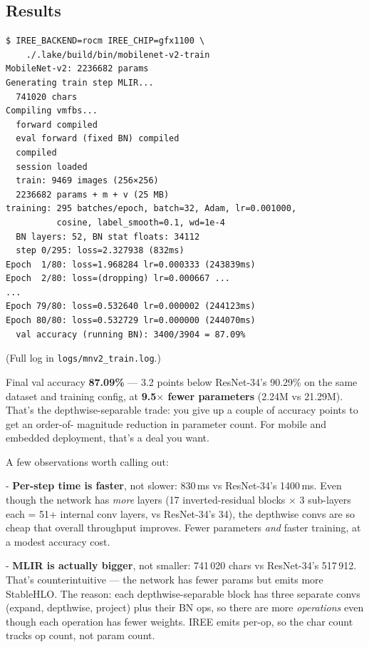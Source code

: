 \subsection*{Results}

\begin{verbatim}
$ IREE_BACKEND=rocm IREE_CHIP=gfx1100 \
    ./.lake/build/bin/mobilenet-v2-train
MobileNet-v2: 2236682 params
Generating train step MLIR...
  741020 chars
Compiling vmfbs...
  forward compiled
  eval forward (fixed BN) compiled
  compiled
  session loaded
  train: 9469 images (256×256)
  2236682 params + m + v (25 MB)
training: 295 batches/epoch, batch=32, Adam, lr=0.001000,
          cosine, label_smooth=0.1, wd=1e-4
  BN layers: 52, BN stat floats: 34112
  step 0/295: loss=2.327938 (832ms)
Epoch  1/80: loss=1.968284 lr=0.000333 (243839ms)
Epoch  2/80: loss=(dropping) lr=0.000667 ...
...
Epoch 79/80: loss=0.532640 lr=0.000002 (244123ms)
Epoch 80/80: loss=0.532729 lr=0.000000 (244070ms)
  val accuracy (running BN): 3400/3904 = 87.09%
\end{verbatim}

(Full log in \texttt{logs/mnv2\_train.log}.)

Final val accuracy \textbf{87.09\%} --- 3.2 points below ResNet-34's
90.29\% on the same dataset and training config, at \textbf{9.5$\times$
fewer parameters} (2.24M vs 21.29M). That's the depthwise-separable
trade: you give up a couple of accuracy points to get an order-of-
magnitude reduction in parameter count. For mobile and embedded
deployment, that's a deal you want.

A few observations worth calling out:

- \textbf{Per-step time is faster}, not slower: 830\,ms vs
  ResNet-34's 1400\,ms. Even though the network has \emph{more}
  layers (17 inverted-residual blocks $\times$ 3 sub-layers each =
  51+ internal conv layers, vs ResNet-34's 34), the depthwise convs
  are so cheap that overall throughput improves. Fewer parameters
  \emph{and} faster training, at a modest accuracy cost.

- \textbf{MLIR is actually bigger}, not smaller: 741\,020 chars vs
  ResNet-34's 517\,912. That's counterintuitive --- the network has
  fewer params but emits more StableHLO. The reason: each
  depthwise-separable block has three separate convs (expand,
  depthwise, project) plus their BN ops, so there are more
  \emph{operations} even though each operation has fewer weights.
  IREE emits per-op, so the char count tracks op count, not param
  count.

